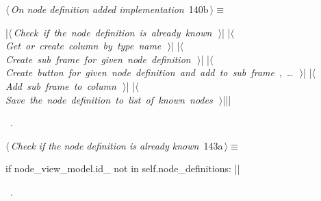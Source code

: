 \documentclass[%
    a4paper,    %
    justified,  %
    nobib,      %
    openany     %
]{tufte-book}
\begin{document}
\begin{flushleft} \small
\begin{minipage}{\linewidth}\label{scrap154}\raggedright\small
{} $\langle\,${\itshape On node definition added implementation}\nobreak\ {\footnotesize {140b}}$\,\rangle\equiv$
\vspace{-1ex}
\begin{pythoncode}
|\hbox{$\langle\,${\itshape Check if the node definition is already known}\nobreak\ {\footnotesize {}}$\,\rangle$}|
|\hbox{$\langle\,${\itshape Get or create column by type name}\nobreak\ {\footnotesize {}}$\,\rangle$}|
|\hbox{$\langle\,${\itshape Create sub frame for given node definition}\nobreak\ {\footnotesize {}}$\,\rangle$}|
|\hbox{$\langle\,${\itshape Create button for given node definition and add to sub frame}\nobreak\ {\footnotesize {}, \ldots\ }$\,\rangle$}|
|\hbox{$\langle\,${\itshape Add sub frame to column}\nobreak\ {\footnotesize {}}$\,\rangle$}|
|\hbox{$\langle\,${\itshape Save the node definition to list of known nodes}\nobreak\ {\footnotesize {}}$\,\rangle$}||\NWsep|
\end{pythoncode}
\vspace{1.5ex}
\footnotesize
\begin{list}{}{\setlength{\itemsep}{-\parsep}\setlength{\itemindent}{-\leftmargin}}
\item \NWtxtMacroRefIn\ .

\item{}
\end{list}
\end{minipage}\vspace{4ex}
\end{flushleft}
%
\begin{flushleft} \small
\begin{minipage}{\linewidth}\label{scrap155}\raggedright\small
{} $\langle\,${\itshape Check if the node definition is already known}\nobreak\ {\footnotesize {143a}}$\,\rangle\equiv$
\vspace{-1ex}
\begin{pythoncode}
if node_view_model.id_ not in self.node_definitions:
|\NWsep|
\end{pythoncode}
\vspace{1.5ex}
\footnotesize
\begin{list}{}{\setlength{\itemsep}{-\parsep}\setlength{\itemindent}{-\leftmargin}}
\item \NWtxtMacroRefIn\ .

\item{}
\end{list}
\end{minipage}\vspace{4ex}
\end{flushleft}
\end{document}
